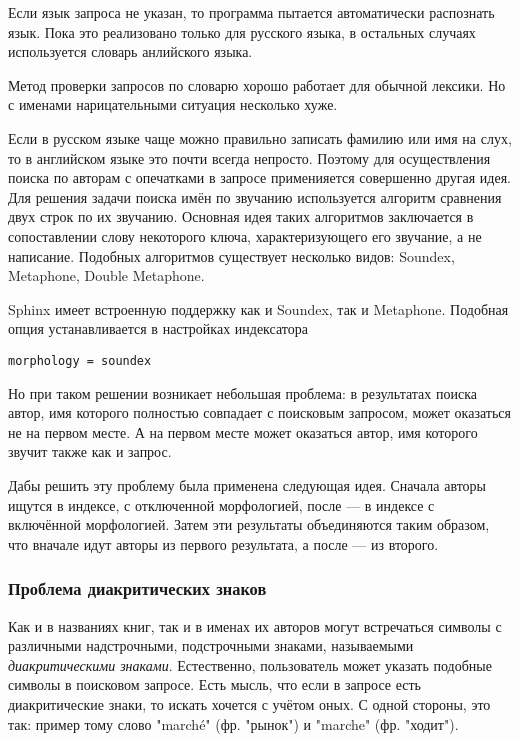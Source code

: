 Если язык запроса не указан, то программа пытается автоматически распознать язык.
Пока это реализовано только для русского языка, в остальных случаях используется словарь анлийского языка.

Метод проверки запросов по словарю хорошо работает для обычной лексики. Но с именами нарицательными ситуация несколько хуже.

Если в русском языке чаще можно правильно записать фамилию или имя на слух, то в английском языке это почти всегда непросто.
Поэтому для осуществления поиска по авторам с опечатками в запросе применияется совершенно другая идея.
Для решения задачи поиска имён по звучанию используется алгоритм сравнения двух строк по их звучанию.
Основная идея таких алгоритмов заключается в сопоставлении слову некоторого ключа, характеризующего его звучание, а не написание.
Подобных алгоритмов существует несколько видов: Soundex, Metaphone, Double Metaphone.

Sphinx имеет встроенную поддержку как и Soundex, так и Metaphone. Подобная опция устанавливается в настройках индексатора
\begin{verbatim}
morphology = soundex
\end{verbatim}

Но при таком решении возникает небольшая проблема: в результатах поиска автор, имя которого полностью совпадает с поисковым запросом, может оказаться не на первом месте. А на первом месте может оказаться автор, имя которого звучит также как и запрос.

Дабы решить эту проблему была применена следующая идея. 
Сначала авторы ищутся в индексе, с отключенной морфологией, после --- в индексе с включённой морфологией.
Затем эти результаты объединяются таким образом, что вначале идут авторы из первого результата, а после --- из второго.

\subsubsection{Проблема диакритических знаков}

Как и в названиях книг, так и в именах их авторов могут встречаться символы с различными надстрочными, подстрочными знаками, называемыми {\em диакритическими знаками}. Естественно, пользователь может указать подобные символы в поисковом запросе.
Есть мысль, что если в запросе есть диакритические знаки, то искать хочется с учётом оных. С одной стороны, это так: пример тому слово "marché" (фр. "рынок") и "marche" (фр. "ходит"). 

